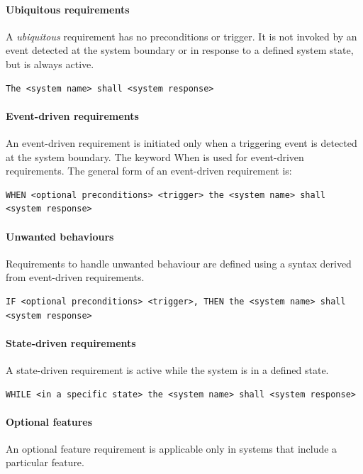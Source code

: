 \paragraph{Ubiquitous requirements} A \emph{ubiquitous} requirement has no preconditions or trigger. It is not invoked by an event detected at the system boundary or in response to a defined system state, but is always active.

\begin{verbatim}
The <system name> shall <system response>
\end{verbatim}

\paragraph{Event-driven requirements} An event-driven requirement is initiated only when a triggering event is detected at the system boundary. The keyword When is used for event-driven requirements. The general form of an event-driven requirement is:

\begin{verbatim}
WHEN <optional preconditions> <trigger> the <system name> shall <system response>
\end{verbatim}


\paragraph{Unwanted behaviours} Requirements to handle unwanted behaviour are defined using a syntax derived from event-driven requirements. 

\begin{verbatim}
IF <optional preconditions> <trigger>, THEN the <system name> shall <system response>
\end{verbatim}

\paragraph{State-driven requirements} A state-driven requirement is active while the system is in a defined state.

\begin{verbatim}
WHILE <in a specific state> the <system name> shall <system response>
\end{verbatim}

\paragraph{Optional features} An optional feature requirement is applicable only in systems that include a particular feature.

